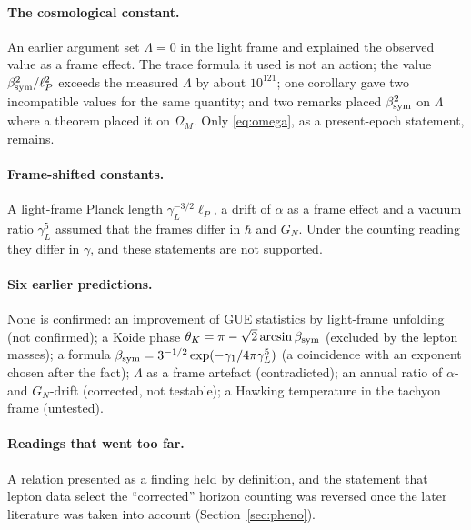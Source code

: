 \paragraph{The cosmological constant.}  An earlier argument set \(\Lambda=0\) in the light frame and explained the observed value as a frame
effect.  The trace formula it used is not an action; the value \(\beta_{\rm sym}^2/\ell_P^2\) exceeds the measured \(\Lambda\) by about \(10^{121}\);
one corollary gave two incompatible values for the same quantity; and two remarks placed \(\beta_{\rm sym}^2\) on \(\Lambda\) where a theorem placed
it on \(\Omega_M\).  Only \eqref{eq:omega}, as a present-epoch statement, remains.

\paragraph{Frame-shifted constants.}  A light-frame Planck length \(\gamma_L^{-3/2}\ell_P\), a drift of \(\alpha\) as a frame effect and a vacuum
ratio \(\gamma_L^5\) assumed that the frames differ in \(\hbar\) and \(G_N\).  Under the counting reading they differ in \(\gamma\), and these statements
are not supported.

\paragraph{Six earlier predictions.}  None is confirmed: an improvement of GUE statistics by light-frame unfolding (not confirmed); a Koide
phase \(\theta_K=\pi-\sqrt2\arcsin\beta_{\rm sym}\) (excluded by the lepton masses); a formula \(\beta_{\rm sym}=3^{-1/2}\exp(-\gamma_1/4\pi\gamma_L^5)\)
(a coincidence with an exponent chosen after the fact); \(\Lambda\) as a frame artefact (contradicted); an annual ratio of \(\alpha\)- and
\(G_N\)-drift (corrected, not testable); a Hawking temperature in the tachyon frame (untested).

\paragraph{Readings that went too far.}  A relation presented as a finding held by definition, and the statement that lepton data select the
``corrected'' horizon counting was reversed once the later literature was taken into account (Section~\ref{sec:pheno}).
